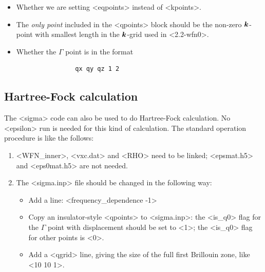\documentclass[hyperref, a4paper, 12pt]{report}
\def\texttt#1{<#1>}%
\newcommand{\shortcode}[1]{\texttt{#1}}
\begin{document}
\begin{enumerate}
\begin{enumerate}
        \begin{itemize}
            \item Whether we are setting \shortcode{eqpoints} instead of \shortcode{kpoints}.
            \item The \emph{only point} included in the \shortcode{qpoints} block
            should be the non-zero $\vb*{k}$-point with smallest length 
            in the $\vb*{k}$-grid used in \shortcode{2.2-wfn0}.
            \item Whether the $\Gamma$ point is in the format 
            \begin{lstlisting}
                qx qy qz 1 2 
            \end{lstlisting}
        \end{itemize}
    \end{enumerate}
\end{enumerate}

\subsection{Hartree-Fock calculation}

The \shortcode{sigma} code can also be used to do Hartree-Fock calculation.
No \shortcode{epsilon} run is needed for this kind of calculation.
The standard operation procedure is like the follows:
\begin{enumerate}
    \item \shortcode{WFN_inner}, \shortcode{vxc.dat} and \shortcode{RHO} 
    need to be linked; 
    \shortcode{epsmat.h5} and \shortcode{eps0mat.h5} 
    are not needed.
    \item The \shortcode{sigma.inp} file should be changed in the following way:
    \begin{itemize}
        \item Add a line: \shortcode{frequency_dependence -1}
        \item Copy an insulator-style \shortcode{qpoints}
            to \shortcode{sigma.inp}:
            the \shortcode{is_q0} flag for the $\Gamma$ point with displacement 
            should be set to \shortcode{1};
            the \shortcode{is_q0} flag for other points is \shortcode{0}.
        \item Add a \shortcode{qgrid} line,
            giving the size of the full first Brillouin zone, 
            like \shortcode{10 10 1}.
    \end{itemize}
\end{enumerate}
\end{document}
